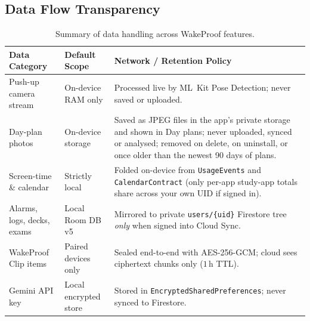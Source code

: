 \documentclass[11pt,a4paper]{article}
\begin{document}
\subsection{Data Flow Transparency}
\begin{table}[ht!]
\centering
\small
\begin{tabularx}{\textwidth}{@{}L{3.5cm}L{3.2cm}Y@{}}
\toprule
\textbf{\sffamily Data Category} & \textbf{\sffamily Default Scope} & \textbf{\sffamily Network / Retention Policy} \\
\midrule
Push-up camera stream & On-device RAM only & Processed live by ML~Kit Pose Detection; never saved or uploaded. \\
Day-plan photos & On-device storage & Saved as JPEG files in the app's private storage and shown in Day plans; never uploaded, synced or analysed; removed on delete, on uninstall, or once older than the newest 90 days of plans. \\
Screen-time \& calendar & Strictly local & Folded on-device from \texttt{UsageEvents} and \texttt{CalendarContract} (only per-app study-app totals share across your own UID if signed in). \\
Alarms, logs, decks, exams & Local Room DB v5 & Mirrored to private \texttt{users/\{uid\}} Firestore tree \emph{only} when signed into Cloud Sync. \\
WakeProof Clip items & Paired devices only & Sealed end-to-end with AES-256-GCM; cloud sees ciphertext chunks only ($1\,\text{h}$ TTL). \\
Gemini API key & Local encrypted store & Stored in \texttt{EncryptedSharedPreferences}; never synced to Firestore. \\
\bottomrule
\end{tabularx}
\caption{Summary of data handling across WakeProof features.}
\end{table}
\end{document}
